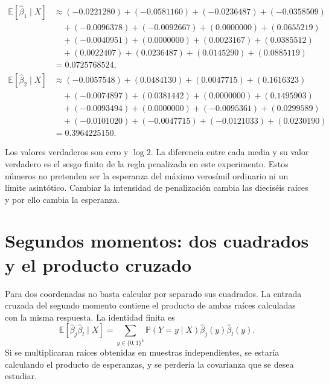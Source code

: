 \documentclass[11pt,a4paper]{article}
\newcommand{\E}{\mathbb E}
\newcommand{\Prob}{\mathbb P}
\begin{document}
\[
\begin{aligned}
\E[\widehat\beta_1\mid X]&\approx(-0.0221280)+(-0.0581160)+(-0.0236487)+(-0.0358509)\\&\quad+(-0.0096378)+(-0.0092667)+(0.0000000)+(0.0655219)\\&\quad+(-0.0040951)+(0.0000000)+(0.0023167)+(0.0385512)\\&\quad+(0.0022407)+(0.0236487)+(0.0145290)+(0.0885119)\\&=0.0725768524,\\\E[\widehat\beta_2\mid X]&\approx(-0.0057548)+(0.0484130)+(0.0047715)+(0.1616323)\\&\quad+(-0.0074897)+(0.0381442)+(0.0000000)+(0.1495903)\\&\quad+(-0.0093494)+(0.0000000)+(-0.0095361)+(0.0299589)\\&\quad+(-0.0101020)+(-0.0047715)+(-0.0121033)+(0.0230190)\\&=0.3964225150.\end{aligned}
\]

Los valores verdaderos son cero y \(\log2\).
La diferencia entre cada media y su valor verdadero
es el sesgo finito de la regla penalizada en este experimento.
Estos números no pretenden ser la esperanza del
máximo verosímil ordinario ni un límite asintótico.
Cambiar la intensidad de penalización cambia las
dieciséis raíces y por ello cambia la esperanza.
\endgroup

\clearpage
\section{Segundos momentos: dos cuadrados y el producto cruzado}\label{logit142}
\begingroup\small
Para dos coordenadas no basta calcular por separado sus cuadrados.
La entrada cruzada del segundo momento contiene el producto
de ambas raíces calculadas con la misma respuesta.
La identidad finita es
\[
\E[\widehat\beta_j\widehat\beta_l\mid X]
=\sum_{y\in\{0,1\}^4}
\Prob(Y=y\mid X)\widehat\beta_j(y)\widehat\beta_l(y).
\]
Si se multiplicaran raíces obtenidas en muestras independientes,
se estaría calculando el producto de esperanzas,
y se perdería la covarianza que se desea estudiar.
\end{document}
